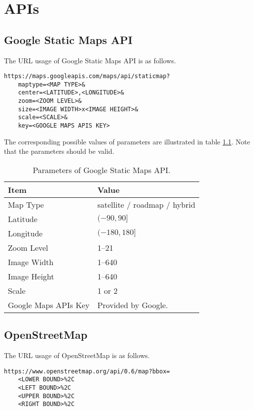 \chapter{APIs}
\section{Google Static Maps API}\label{app:apimap}
The URL usage of Google Static Maps API is as follows.
\begin{lstlisting}[frame=single]
https://maps.googleapis.com/maps/api/staticmap?
	maptype=<MAP TYPE>&
	center=<LATITUDE>,<LONGITUDE>&
	zoom=<ZOOM LEVEL>&
	size=<IMAGE WIDTH>x<IMAGE HEIGHT>&
	scale=<SCALE>&
	key=<GOOGLE MAPS APIS KEY>
\end{lstlisting}

The corresponding possible values of parameters are illustrated in table \ref{tab:googlemapsapi}. Note that the parameters should be valid.

\begin{table}[!h]
	\centering
	\caption[Parameters of Google Static Maps API]{Parameters of Google Static Maps API.}
	\label{tab:googlemapsapi}
	\begin{tabular}{l|l}
	\hline
	\textbf{Item} & \textbf{Value} \\
	\hline
	Map Type & satellite / roadmap / hybrid \\
	Latitude & $(-90, 90]$ \\
	Longitude & $(-180, 180]$ \\
	Zoom Level & 1--21 \\
	Image Width & 1--640 \\
	Image Height & 1--640 \\
	Scale & 1 or 2 \\
	Google Maps APIs Key & Provided by Google. \\
	\hline
	\end{tabular}
\end{table}

\newpage

\section{OpenStreetMap}\label{app:apiosm}
The URL usage of OpenStreetMap is as follows.

\begin{lstlisting}[frame=single]
https://www.openstreetmap.org/api/0.6/map?bbox=
	<LOWER BOUND>%2C
	<LEFT BOUND>%2C
	<UPPER BOUND>%2C
	<RIGHT BOUND>%2C
\end{lstlisting}


